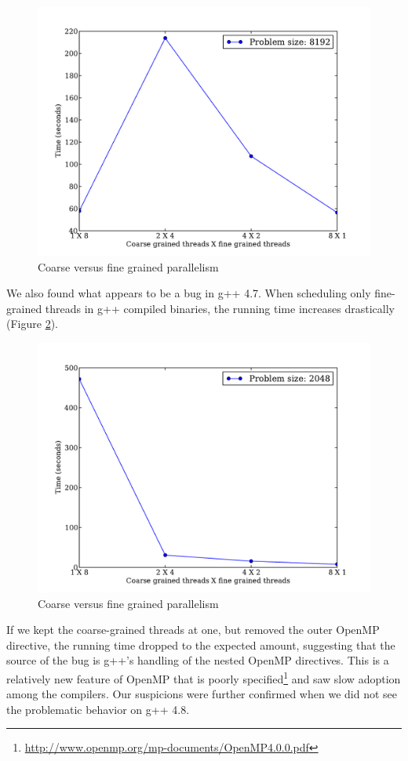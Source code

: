 \documentclass[11pt,onecolumn]{article}
\begin{document}
\begin{figure}[h!]
\centering
\includegraphics[width=.75\linewidth]{figures/coarse_versus_fine-grained_parallelism_(intel)}
\caption{Coarse versus fine grained parallelism}
\label{fig:combo}
\end{figure}

We also found what appears to be a bug in g++ 4.7. When scheduling only fine-grained threads in g++ compiled binaries, the running time increases drastically (Figure \ref{fig:combo_gcc}).

\begin{figure}[h!]
\centering
\includegraphics[width=.75\linewidth]{figures/coarse_versus_fine-grained_parallelism_(gcc)}
\caption{Coarse versus fine grained parallelism}
\label{fig:combo_gcc}
\end{figure}

If we kept the coarse-grained threads at one, but removed the outer OpenMP directive, the running time dropped to the expected amount, suggesting that the source of the bug is g++'s handling of the nested OpenMP directives. This is a relatively new feature of OpenMP that is poorly specified\footnote{\url{http://www.openmp.org/mp-documents/OpenMP4.0.0.pdf}} and saw slow adoption among the compilers. Our suspicions were further confirmed when we did not see the problematic behavior on g++ 4.8.
\end{document}
